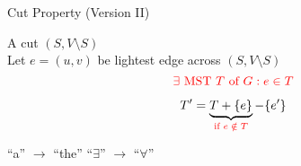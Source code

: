 \begin{frame}{}
  \begin{exampleblock}{Cut Property (Version II)}
    \begin{center}
      A cut $(S, V \setminus S)$ \\[6pt]
      Let $e = (u,v)$ be  lightest edge across $(S, V \setminus S)$
      \[
        \textcolor{red}{\exists \text{ MST $T$ of } G: e \in T}
      \]
    \end{center}
  \end{exampleblock}


  \pause
  \vspace{-0.50cm}
  \[
    T' = \underbrace{T + \{e\}}_{\textcolor{red}{\text{if } e \;\notin\; T}} - \{e'\}
  \]

  \pause
  \begin{center}
    {``a'' $\to$ ``the'' \red{$\implies$} ``$\exists$'' $\to$ ``$\forall$''}
  \end{center}
\end{frame}
